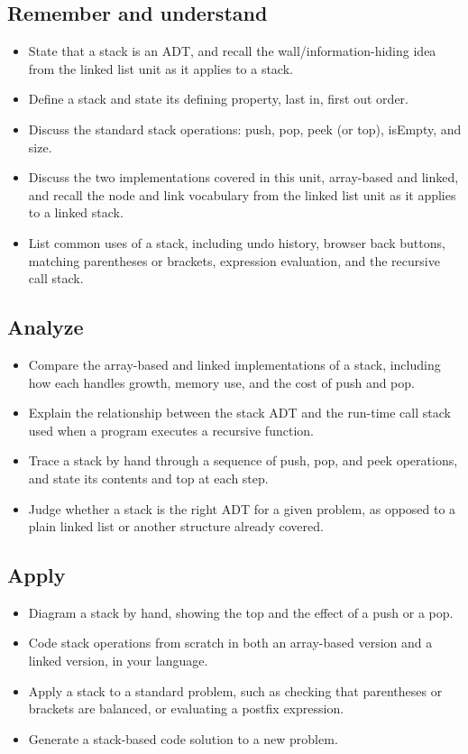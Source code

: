 \documentclass[11pt]{article}
\begin{document}
\subsection*{Remember and understand}
\begin{itemize}[leftmargin=1.4em]
  \item State that a stack is an ADT, and recall the wall/information-hiding idea from the
    linked list unit as it applies to a stack.
  \item Define a stack and state its defining property, last in, first out order.
  \item Discuss the standard stack operations: push, pop, peek (or top), isEmpty, and size.
  \item Discuss the two implementations covered in this unit, array-based and linked, and
    recall the node and link vocabulary from the linked list unit as it applies to a linked
    stack.
  \item List common uses of a stack, including undo history, browser back buttons, matching
    parentheses or brackets, expression evaluation, and the recursive call stack.
\end{itemize}

\subsection*{Analyze}
\begin{itemize}[leftmargin=1.4em]
  \item Compare the array-based and linked implementations of a stack, including how each
    handles growth, memory use, and the cost of push and pop.
  \item Explain the relationship between the stack ADT and the run-time call stack used
    when a program executes a recursive function.
  \item Trace a stack by hand through a sequence of push, pop, and peek operations, and
    state its contents and top at each step.
  \item Judge whether a stack is the right ADT for a given problem, as opposed to a plain
    linked list or another structure already covered.
\end{itemize}

\subsection*{Apply}
\begin{itemize}[leftmargin=1.4em]
  \item Diagram a stack by hand, showing the top and the effect of a push or a pop.
  \item Code stack operations from scratch in both an array-based version and a linked
    version, in your language.
  \item Apply a stack to a standard problem, such as checking that parentheses or brackets
    are balanced, or evaluating a postfix expression.
  \item Generate a stack-based code solution to a new problem.
\end{itemize}
\end{document}
